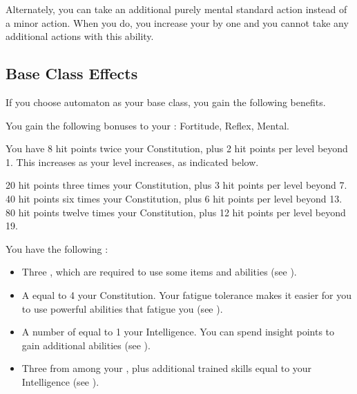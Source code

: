         Alternately, you can take an additional purely mental standard action instead of a minor action.
        When you do, you increase your  by one and you  cannot take any additional actions with this ability.

    \subsection{Base Class Effects}
        If you choose automaton as your base class, you gain the following benefits.

        You gain the following bonuses to your :  Fortitude,  Reflex,  Mental.

            You have 8 hit points \add twice your Constitution, plus 2 hit points per level beyond 1.
            This increases as your level increases, as indicated below.
            \begin{itemize}
                 20 hit points \add three times your Constitution, plus 3 hit points per level beyond 7.
                 40 hit points \add six times your Constitution, plus 6 hit points per level beyond 13.
                 80 hit points \add twelve times your Constitution, plus 12 hit points per level beyond 19.
            \end{itemize}

         You have the following :
        \begin{itemize}
            \item Three , which are required to use some items and abilities (see ).
            \item A  equal to 4 \add your Constitution.
                Your fatigue tolerance makes it easier for you to use powerful abilities that fatigue you (see ).
            \item A number of  equal to 1 \add your Intelligence.
                You can spend insight points to gain additional abilities (see ).
            \item Three  from among your , plus additional trained skills equal to your Intelligence (see ).
        \end{itemize}

